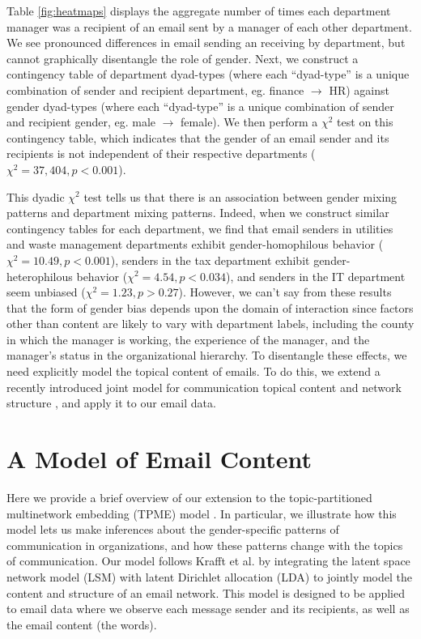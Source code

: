 \documentclass{pnastwo}
\begin{document}
\begin{article}
	
	
Table \ref{fig:heatmaps} displays the aggregate number of times each department manager was a recipient of an email sent by a manager of each other department. We see pronounced differences in email sending an receiving by department, but cannot graphically disentangle the role of gender. 
Next, we construct a contingency table of department dyad-types (where each ``dyad-type'' is a unique combination of sender and recipient department, eg. finance $\longrightarrow$ HR) against gender dyad-types (where each ``dyad-type'' is a unique combination of sender and recipient gender, eg. male $\longrightarrow$ female).  We then perform a $\chi^2$ test on this contingency table, which indicates that the gender of an email sender and its recipients is not independent of their respective departments ($\chi^2 = 37,404, p < 0.001$).
	
	
This dyadic $\chi^2$ test tells us that there is an association between gender mixing patterns and department mixing patterns. Indeed, when we construct similar contingency tables for each department, we find that email senders in utilities and waste management departments exhibit gender-homophilous behavior ($\chi^2 = 10.49, p < 0.001$), senders in the tax department exhibit gender-heterophilous behavior ($\chi^2 = 4.54, p < 0.034$), and senders in the IT department seem unbiased ($\chi^2 = 1.23, p > 0.27$). However, we can't say from these results that the form of gender bias depends upon the domain of interaction since factors other than content are likely to vary with department labels, including the county in which the manager is working, the experience of the manager, and the manager's status in the organizational hierarchy. To disentangle these effects, we need explicitly model the topical content of emails. To do this, we extend a recently introduced joint model for communication topical content and network structure \citep{Krafft2012}, and apply it to our email data.
	


\section{A Model of Email Content}
Here we provide a brief overview of our extension to the topic-partitioned
multinetwork embedding (TPME) model \citep{Krafft2012}. In particular, we illustrate how this model lets us make inferences about the gender-specific patterns of communication in organizations, and how these patterns change with the topics of communication. Our model follows Krafft et al. \citep{Krafft2012} by integrating the latent space network model (LSM) \citep{Hoff2002a} with latent Dirichlet allocation (LDA) \cite{Blei2003} to jointly model the content and structure of an email network. This model is designed to be applied to email data where we observe each message sender and its recipients, as well as the email content (the words). 


\end{article}
\end{document}
